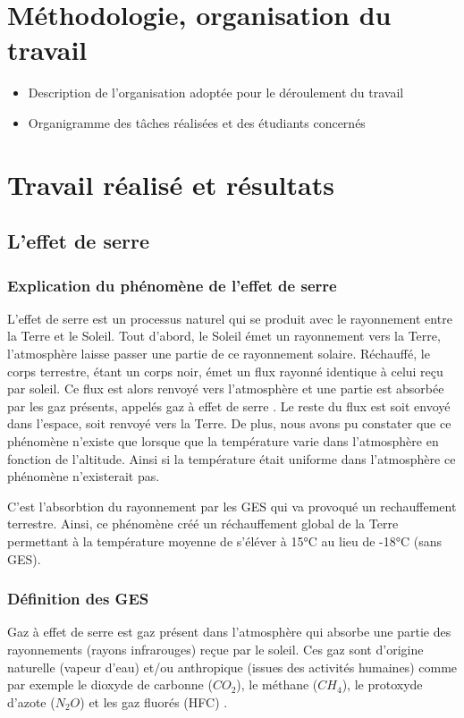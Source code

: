 \documentclass[a4paper, 12pt]{report} %
\begin{document}
\chapter{Méthodologie, organisation du travail}

\begin{itemize}
\item Description de l'organisation adoptée pour le déroulement du travail
\item Organigramme des tâches réalisées et des étudiants concernés
\end{itemize}


\chapter{Travail réalisé et résultats}

\section{L'effet de serre}

\subsection{Explication du phénomène de l'effet de serre}

	L'effet de serre est un processus naturel qui se produit 
avec le rayonnement entre la Terre et le Soleil. Tout d'abord, 
le Soleil émet un rayonnement vers la Terre, l'atmosphère 
laisse passer une partie de ce rayonnement solaire. Réchauffé, 
le corps terrestre, étant un corps noir, émet un flux rayonné 
identique à celui reçu par soleil. Ce flux est alors renvoyé 
vers l'atmosphère et une partie est absorbée par les gaz 
présents, appelés gaz à effet de serre . Le reste du flux 
est soit envoyé dans l'espace, soit renvoyé vers la Terre. 
De plus, nous avons pu constater que ce phénomène n'existe 
que lorsque que la température varie dans l'atmosphère en 
fonction de l'altitude. Ainsi si la température était uniforme 
dans l'atmosphère ce phénomène n'existerait pas. \vspace{\baselineskip}

	C'est l'absorbtion du rayonnement par les GES qui va 
provoqué un rechauffement terrestre. Ainsi, ce phénomène 
créé un réchauffement global de la Terre permettant à la 
température moyenne de s'éléver à 15°C au lieu de -18°C 
(sans GES).  

\subsection{Définition des GES}
Gaz à effet de serre est gaz présent dans l'atmosphère qui 
absorbe une partie des rayonnements (rayons infrarouges) 
reçue par le soleil. Ces gaz sont d'origine naturelle 
(vapeur d'eau) et/ou anthropique 
(issues des activités humaines) comme par exemple le dioxyde 
de carbonne ($CO_2$), le méthane ($CH_4$), le protoxyde d'azote
($N_2O$) et les gaz fluorés (HFC) . \vspace{\baselineskip}
\end{document}
